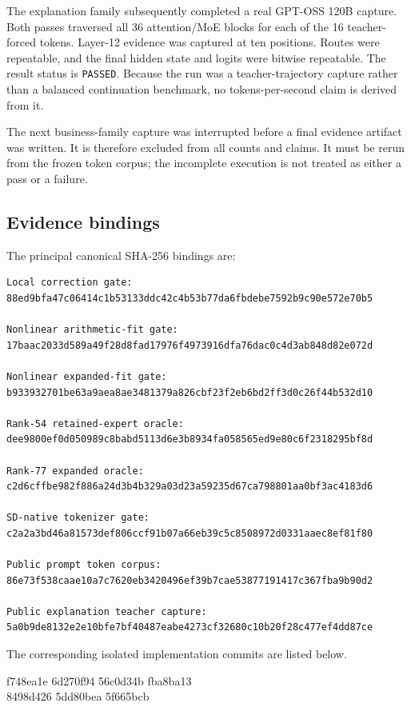 The explanation family subsequently completed a real GPT-OSS 120B capture.
Both passes traversed all 36 attention/MoE blocks for each of the 16
teacher-forced tokens.  Layer-12 evidence was captured at ten positions.
Routes were repeatable, and the final hidden state and logits were bitwise
repeatable.  The result status is \texttt{PASSED}.  Because the run was a
teacher-trajectory capture rather than a balanced continuation benchmark, no
tokens-per-second claim is derived from it.

The next business-family capture was interrupted before a final evidence
artifact was written.  It is therefore excluded from all counts and claims.
It must be rerun from the frozen token corpus; the incomplete execution is not
treated as either a pass or a failure.

\subsection{Evidence bindings}

The principal canonical SHA-256 bindings are:
\begin{footnotesize}
\begin{verbatim}
Local correction gate:
88ed9bfa47c06414c1b53133ddc42c4b53b77da6fbdebe7592b9c90e572e70b5

Nonlinear arithmetic-fit gate:
17baac2033d589a49f28d8fad17976f4973916dfa76dac0c4d3ab848d82e072d

Nonlinear expanded-fit gate:
b933932701be63a9aea8ae3481379a826cbf23f2eb6bd2ff3d0c26f44b532d10

Rank-54 retained-expert oracle:
dee9800ef0d050989c8babd5113d6e3b8934fa058565ed9e80c6f2318295bf8d

Rank-77 expanded oracle:
c2d6cffbe982f886a24d3b4b329a03d23a59235d67ca798801aa0bf3ac4183d6

SD-native tokenizer gate:
c2a2a3bd46a81573def806ccf91b07a66eb39c5c8508972d0331aaec8ef81f80

Public prompt token corpus:
86e73f538caae10a7c7620eb3420496ef39b7cae53877191417c367fba9b90d2

Public explanation teacher capture:
5a0b9de8132e2e10bfe7bf40487eabe4273cf32680c10b20f28c477ef4dd87ce
\end{verbatim}
\end{footnotesize}

The corresponding isolated implementation commits are listed below.
\begin{center}
\small\ttfamily
f748ea1e \quad 6d270f94 \quad 56c0d34b \quad fba8ba13 \\
8498d426 \quad 5dd80bea \quad 5f665bcb
\end{center}

